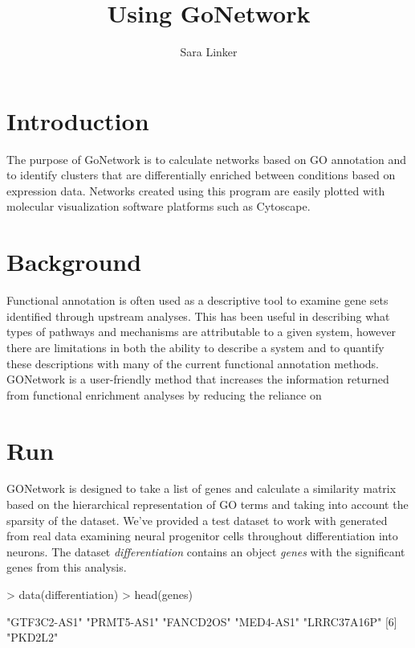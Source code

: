 \documentclass{article}
\title{Using GoNetwork}
\author{Sara Linker}
\begin{document}
\maketitle


\section*{Introduction}
  The purpose of GoNetwork is to calculate networks based on GO annotation and to identify clusters that are differentially enriched between conditions based on expression data. Networks created using this program are easily plotted with molecular visualization software platforms such as Cytoscape. 

 \section*{Background}
   Functional annotation is often used as a descriptive tool to examine gene sets identified through upstream analyses. This has been useful in describing what types of pathways and mechanisms are attributable to a given system, however there are limitations in both the ability to describe a system and to quantify these descriptions with many of the current functional annotation methods. GONetwork is a user-friendly method that increases the information returned from functional enrichment analyses by reducing the reliance on 


\section*{Run}
GONetwork is designed to take a list of genes and calculate a similarity matrix based on the hierarchical representation of GO terms and taking into account the sparsity of the dataset. We've provided a test dataset to work with generated from real data examining neural progenitor cells throughout differentiation into neurons. The dataset \textsl{differentiation} contains an object \textsl{genes} with the significant genes from this analysis.

\begin{Schunk}
\begin{Sinput}
> data(differentiation)
> head(genes)
\end{Sinput}
\begin{Soutput}
[1] "GTF3C2-AS1" "PRMT5-AS1"  "FANCD2OS"   "MED4-AS1"   "LRRC37A16P"
[6] "PKD2L2"    
\end{Soutput}
\end{Schunk}
\end{document}
